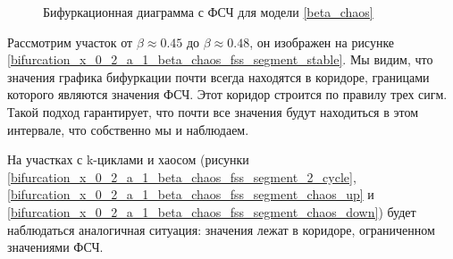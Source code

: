 \begin{figure}
            
        \caption{Бифуркационная диаграмма с ФСЧ для модели \ref{beta_chaos}}
    \end{figure}

    Рассмотрим участок от \(\beta \approx 0.45\) до \(\beta \approx 0.48\), он изображен на рисунке \ref{bifurcation_x_0_2_a_1_beta_chaos_fss_segment_stable}. Мы видим, что значения графика бифуркации почти всегда находятся в коридоре, границами которого являются значения ФСЧ. Этот коридор строится по правилу трех сигм. Такой подход гарантирует, что почти все значения будут находиться в этом интервале, что собственно мы и наблюдаем.

    На участках с k-циклами и хаосом (рисунки \ref{bifurcation_x_0_2_a_1_beta_chaos_fss_segment_2_cycle}, \ref{bifurcation_x_0_2_a_1_beta_chaos_fss_segment_chaos_up} и \ref{bifurcation_x_0_2_a_1_beta_chaos_fss_segment_chaos_down}) будет наблюдаться аналогичная ситуация: значения лежат в коридоре, ограниченном значениями ФСЧ.
